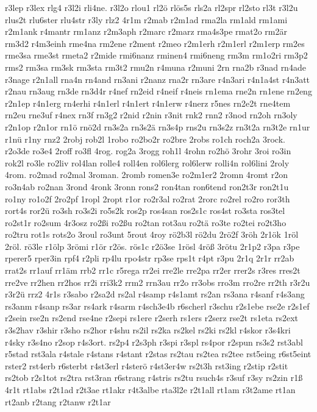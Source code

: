 {r3lep
r3lex
rlg4
r3l2i
rli4ne.
r3l2o
rlou1
rl2ö
rlös5s
rls2a
rl2spr
rl2sto
rl3t
r3l2u
rlus2t
rlu6ster
rlu4str
r3ly
rlz2
4r1m
r2mab
r2m1ad
rma2la
rm1ald
rm1ami
r2m1ank
r4mantr
rm1anz
r2m3aph
r2marc
r2marz
rma4s3pe
rmat2o
rm2är
rm3d2
r4m3einh
rme4na
rm2ene
r2ment
r2meo
r2m1erh
r2m1erl
r2m1erp
rm2es
rme3sa
rme3st
rmeta2
r2mide
rmi6nanz
rminen4
rmi6neng
rm3m
rm1o2ri
rm3p2
rms2
rm3sa
rm3sk
rm3sta
rm3t2
rmu2n
r4muna
r2muni
2rn
rna2b
r3nad
rn4ade
r3nage
r2n1all
rna4n
rn4and
rn3ani
r2nanz
rna2r
rn3are
r4n3ari
r4n1a4st
r4n3att
r2nau
rn3aug
rn3de
rn3d4r
r4nef
rn2eid
r4neif
r4neis
rn1ema
rne2n
rn1ene
rn2eng
r2n1ep
r4n1erg
rn4erhi
r4n1erl
r4n1ert
r4n1erw
r4nerz
r5nes
rn2e2t
rne4tem
rn2eu
rne3uf
r4nex
rn3f
rn3g2
r2nid
r2nin
r3nit
rnk2
rnn2
r3nod
rn2oh
rn3oly
r2n1op
r2n1or
rn1ö
rnö2d
rn3s2a
rn3s2ä
rn3s4p
rns2u
rn3s2z
rn3t2a
rn3t2e
rn1ur
r1nü
r1ny
rnz2
2robj
rob2l
1robo
ro2bo2r
ro2bre
2robs
ro1ch
roch2a
3rock.
r2o3de
ro3e4
2roff
ro3fl
4rog.
rog2a
3rogg
roh1l
4rohn
ro2hö
3rohr
3roi
ro3in
rok2l
ro3le
ro2liv
rol4lan
rolle4
roll4en
rol6lerg
rol6lerw
rolli4n
rol6lini
2roly
4rom.
ro2mad
ro2mal
3roman.
2romb
romen3e
ro2m1er2
2romn
4romt
r2on
ro3n4ab
ro2nan
3rond
4ronk
3ronn
rons2
ron4tan
ron6tend
ron2t3r
ron2t1u
ro1ny
ro1o2f
2ro2pf
1ropl
2ropt
r1or
ro2r3al
ro2rat
2rorc
ro2rel
ro2ro
ror3th
rort4s
ror2ü
ro3sh
ro3s2i
ro5s2k
ros2p
ros4san
ros2s1c
ros4st
ro3sta
ros3tel
ro2st1r
ro2sum
4r3osz
ro2ßi
ro2ßu
ro2tan
rot3au
ro2tä
ro3te
ro2tei
ro2t3ho
ro2tru
rot1s
rots2o
3roul
ro3unt
5rout
4roy
rö2b3l
rö2du
2rö2f
3röh
2r1ök
1röl
2röl.
rö3le
r1ölp
3römi
r1ör
r2ös.
rös1c
r2ö3se
1rösl
4röß
3rötu
2r1p2
r3pa
r3pe
rperer5
rper3in
rpf4
r2pli
rp4lu
rpo4str
rp3se
rps1t
r4pt
r3pu
2r1q
2r1r
rr2ab
rrat2s
rr1auf
rr1äm
rrb2
rr1c
r5rega
rr2ei
rre2le
rre2pa
rr2er
rrer2s
r3res
rres2t
rre2ve
rr2hen
rr2hos
rr2i
rri3k2
rrm2
rrn3au
rr2o
rr3obs
rro3m
rro2re
rr2th
r3r2u
r3r2ü
rrz2
4r1s
r3sabo
r2sa2d
rs2al
r4samp
r4s1amt
rs2an
rs3ana
r4sanf
r4s3ang
rs3anm
r4sanp
rs3ar
rs4ark
r4sarm
r4sch3e4b
r6scherl
r3schu
r2s1ebe
rse2e
r2s1ef
r2sein
rse2n
rs2end
rse4ne
r2sepi
rs1ere
r2serh
rs1ers
r2serz
rse2t
rs1eta
rs2ext
r3s2hav
r3shir
r3sho
rs2hor
r4shu
rs2il
rs2ka
rs2kel
rs2ki
rs2kl
r4skor
r3s4kri
r4sky
r3s4no
r2sop
r4s3ort.
rs2p4
r2s3ph
r3spi
r3spl
rs4por
r2spun
rs3s2
rst3abl
r5stad
rst3ala
r4stale
r4stans
r4stant
r2stas
rs2tau
rs2tea
rs2tee
rst5eing
r6st5eint
rster2
rst4erb
r6sterbt
r4st3erl
r4sterö
r4st3er4w
rs2t3h
rst3ing
r2stip
r2stit
rs2tob
r2s1tot
rs2tra
rst3ran
r6strang
r4stris
rs2tu
rsuch4s
r3suf
r3sy
rs2zin
r1ß
4r1t
rt1abs
r2t1ad
r2t3ae
rt1akr
r4t3albe
rta3l2e
r2t1all
rt1am
r3t2ame
rt1an
rt2anb
r2tang
r2tanw
r2t1ar
}
